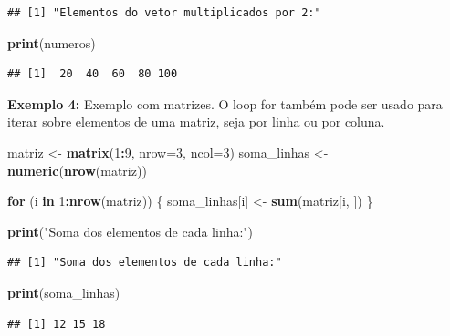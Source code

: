\documentclass[
]{book}
\newenvironment{Shaded}{\begin{snugshade}}{\end{snugshade}}
\newcommand{\AttributeTok}[1]{\textcolor[rgb]{0.13,0.29,0.53}{#1}}
\newcommand{\ControlFlowTok}[1]{\textcolor[rgb]{0.13,0.29,0.53}{\textbf{#1}}}
\newcommand{\DecValTok}[1]{\textcolor[rgb]{0.00,0.00,0.81}{#1}}
\newcommand{\FunctionTok}[1]{\textcolor[rgb]{0.13,0.29,0.53}{\textbf{#1}}}
\newcommand{\NormalTok}[1]{#1}
\newcommand{\OtherTok}[1]{\textcolor[rgb]{0.56,0.35,0.01}{#1}}
\newcommand{\SpecialCharTok}[1]{\textcolor[rgb]{0.81,0.36,0.00}{\textbf{#1}}}
\newcommand{\StringTok}[1]{\textcolor[rgb]{0.31,0.60,0.02}{#1}}
\begin{document}
\begin{verbatim}
## [1] "Elementos do vetor multiplicados por 2:"
\end{verbatim}

\begin{Shaded}
\begin{Highlighting}[]
\FunctionTok{print}\NormalTok{(numeros)}
\end{Highlighting}
\end{Shaded}

\begin{verbatim}
## [1]  20  40  60  80 100
\end{verbatim}

\textbf{Exemplo 4:} Exemplo com matrizes. O loop for também pode ser usado para iterar sobre elementos de uma matriz, seja por linha ou por coluna.

\begin{Shaded}
\begin{Highlighting}[]
\NormalTok{matriz }\OtherTok{\textless{}{-}} \FunctionTok{matrix}\NormalTok{(}\DecValTok{1}\SpecialCharTok{:}\DecValTok{9}\NormalTok{, }\AttributeTok{nrow=}\DecValTok{3}\NormalTok{, }\AttributeTok{ncol=}\DecValTok{3}\NormalTok{)}
\NormalTok{soma\_linhas }\OtherTok{\textless{}{-}} \FunctionTok{numeric}\NormalTok{(}\FunctionTok{nrow}\NormalTok{(matriz))}

\ControlFlowTok{for}\NormalTok{ (i }\ControlFlowTok{in} \DecValTok{1}\SpecialCharTok{:}\FunctionTok{nrow}\NormalTok{(matriz)) \{}
\NormalTok{  soma\_linhas[i] }\OtherTok{\textless{}{-}} \FunctionTok{sum}\NormalTok{(matriz[i, ])}
\NormalTok{\}}

\FunctionTok{print}\NormalTok{(}\StringTok{"Soma dos elementos de cada linha:"}\NormalTok{)}
\end{Highlighting}
\end{Shaded}

\begin{verbatim}
## [1] "Soma dos elementos de cada linha:"
\end{verbatim}

\begin{Shaded}
\begin{Highlighting}[]
\FunctionTok{print}\NormalTok{(soma\_linhas)}
\end{Highlighting}
\end{Shaded}

\begin{verbatim}
## [1] 12 15 18
\end{verbatim}
\end{document}
